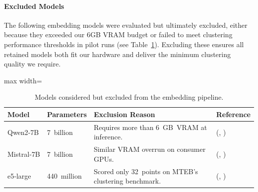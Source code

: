 \documentclass[10pt,oneside]{report}
\renewcommand{\citet}[1]{\citeauthor{#1}, \citeyear{#1}}
\begin{document}
\paragraph{Excluded Models}
The following embedding models were evaluated but ultimately excluded, either because they exceeded our 6GB VRAM budget or failed to meet clustering performance thresholds in pilot runs (see Table~\ref{tab:excludedModels}). Excluding these ensures all retained models both fit our hardware and deliver the minimum clustering quality we require.

\begin{table}[htbp]
    \fontsize{8}{11}\selectfont
    \centering
    \begin{adjustbox}{max width=\textwidth}
        \begin{tabular}{p{1.6cm} p{1.7cm} p{7.3cm} p{2.5cm}}
        \toprule
        \textbf{Model} & \textbf{Parameters} & \textbf{Exclusion Reason} & \textbf{Reference}\\
        \midrule
        Qwen2‑7B   & 7 billion   & Requires more than 6 GB VRAM at inference. & (\citet{yang2407qwen2}) \\
        Mistral‑7B & 7 billion   & Similar VRAM overrun on consumer GPUs. & (\citet{wang2023improving}) \\
        e5‑large   & 440 million & Scored only 32 points on MTEB’s clustering  benchmark. & (\citet{wang2024multilingual})\\
        \bottomrule
        \end{tabular}
    \end{adjustbox}
    \caption{Models considered but excluded from the embedding pipeline.}
    \label{tab:excludedModels}
\end{table}
\end{document}
